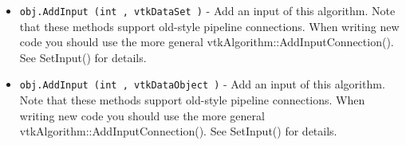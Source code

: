 \begin{itemize}
\item  \verb|obj.AddInput (int , vtkDataSet )| -  Add an input of this algorithm.  Note that these methods support
 old-style pipeline connections.  When writing new code you should
 use the more general vtkAlgorithm::AddInputConnection().  See
 SetInput() for details.

\item  \verb|obj.AddInput (int , vtkDataObject )| -  Add an input of this algorithm.  Note that these methods support
 old-style pipeline connections.  When writing new code you should
 use the more general vtkAlgorithm::AddInputConnection().  See
 SetInput() for details.

\end{itemize}

